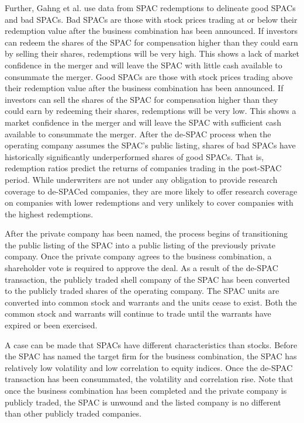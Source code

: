 \documentclass[11pt]{article}
\begin{document}
Further, Gahng et al. use data from SPAC redemptions to delineate good SPACs and bad SPACs. Bad SPACs are those with stock prices trading at or below their redemption value after the business combination has been announced. If investors can redeem the shares of the SPAC for compensation higher than they could earn by selling their shares, redemptions will be very high. This shows a lack of market confidence in the merger and will leave the SPAC with little cash available to consummate the merger. Good SPACs are those with stock prices trading above their redemption value after the business combination has been announced. If investors can sell the shares of the SPAC for compensation higher than they could earn by redeeming their shares, redemptions will be very low. This shows a market confidence in the merger and will leave the SPAC with sufficient cash available to consummate the merger. After the de-SPAC process when the operating company assumes the SPAC's public listing, shares of bad SPACs have historically significantly underperformed shares of good SPACs. That is, redemption ratios predict the returns of companies trading in the post-SPAC period. While underwriters are not under any obligation to provide research coverage to de-SPACed companies, they are more likely to offer research coverage on companies with lower redemptions and very unlikely to cover companies with the highest redemptions.

After the private company has been named, the process begins of transitioning the public listing of the SPAC into a public listing of the previously private company. Once the private company agrees to the business combination, a shareholder vote is required to approve the deal. As a result of the de-SPAC transaction, the publicly traded shell company of the SPAC has been converted to the publicly traded shares of the operating company. The SPAC units are converted into common stock and warrants and the units cease to exist. Both the common stock and warrants will continue to trade until the warrants have expired or been exercised.

A case can be made that SPACs have different characteristics than stocks. Before the SPAC has named the target firm for the business combination, the SPAC has relatively low volatility and low correlation to equity indices. Once the de-SPAC transaction has been consummated, the volatility and correlation rise. Note that once the business combination has been completed and the private company is publicly traded, the SPAC is unwound and the listed company is no different than other publicly traded companies.
\end{document}
